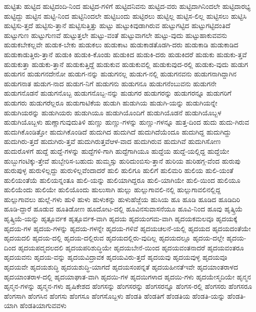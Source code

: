 {ಹುಟ್ಟಿತು
ಹುಟ್ಟಿದ
ಹುಟ್ಟಿದಂದಿ-ನಿಂದ
ಹುಟ್ಟಿದ-ಗಳಿಗೆ
ಹುಟ್ಟಿದನಿವನು
ಹುಟ್ಟಿದ-ವರು
ಹುಟ್ಟಿದಾಗಿನಿಂದಲೇ
ಹುಟ್ಟಿದಾರಭ್ಯ
ಹುಟ್ಟಿದ್ದು
ಹುಟ್ಟಿನ
ಹುಟ್ಟಿ-ನಿಂದ
ಹುಟ್ಟಿನಿಂದಲೇ
ಹುಟ್ಟಿಬಂದು
ಹುಟ್ಟಿರಲು
ಹುಟ್ಟಿಲ್ಲ
ಹುಟ್ಟಿಸ-ಲಿಲ್ಲ
ಹುಟ್ಟಿಸಲು
ಹುಟ್ಟಿಸಿ
ಹುಟ್ಟಿಸು-ತ್ತದೆ
ಹುಟ್ಟಿಸು-ತ್ತಾನೆ
ಹುಟ್ಟಿಸುತ್ತಿತ್ತು
ಹುಟ್ಟು
ಹುಟ್ಟುಕಿವುಡಾಗಿರುವ
ಹುಟ್ಟುಗಟ್ಟಿದ
ಹುಟ್ಟುಗಟ್ಟಿದಂತಿದೆ
ಹುಟ್ಟುಗುಣ
ಹುಟ್ಟುಗುಣವೆ
ಹುಟ್ಟುತ್ತಲೇ
ಹುಟ್ಟು-ವಂತೆ
ಹುಟ್ಟುವಾಗಲೇ
ಹುಟ್ಟು-ವುದು
ಹುಟ್ಟುಹಾಕುವವನು
ಹುಡುಕಬೇಕಲ್ಲವೇ
ಹುಡುಕ-ಬೇಕು
ಹುಡುಕಲು
ಹುಡುಕಾಟ
ಹುಡುಕಾಡತೊಡಗಿ-ದರು
ಹುಡುಕಾಡಿ
ಹುಡುಕಾಡಿದ
ಹುಡುಕಾಡುತ್ತಿರು-ತ್ತಾನೆ
ಹುಡುಕಿ
ಹುಡುಕಿ-ಕೊಂಡು
ಹುಡುಕಿದ
ಹುಡುಕಿ-ದರು
ಹುಡುಕಿದರೆ
ಹುಡುಕು
ಹುಡುಕು-ತ್ತವೆ
ಹುಡುಕುತ್ತಾ
ಹುಡುಕು-ತ್ತಾನೆ
ಹುಡುಕುತ್ತಿದ್ದೆ
ಹುಡುಕುವ
ಹುಡುಕುವಲ್ಲಿ
ಹುಡುಕುವುದ-ರಲ್ಲಿ
ಹುಡುಕು-ವುದು
ಹುಡುಗ
ಹುಡುಗನ
ಹುಡುಗನದೇನೋ
ಹುಡುಗ-ನನ್ನು
ಹುಡುಗನಲ್ಲ
ಹುಡುಗ-ನಲ್ಲಿ
ಹುಡುಗನವನು
ಹುಡುಗನಾಗಿದ್ದಾಗಿನ
ಹುಡುಗನಾತ
ಹುಡುಗ-ನಾದ
ಹುಡುಗ-ನಿಗೆ
ಹುಡುಗನು
ಹುಡುಗನೂ
ಹುಡುಗನೆಂಬುವನು
ಹುಡುಗನೇ
ಹುಡುಗನೊಡನೆ
ಹುಡುಗನೊಬ್ಬ
ಹುಡುಗನೊಬ್ಬ-ನನ್ನು
ಹುಡುಗರ
ಹುಡುಗರನ್ನು
ಹುಡುಗರನ್ನೂ
ಹುಡುಗರಿಗೆ
ಹುಡುಗರು
ಹುಡುಗರೆಲ್ಲರೂ
ಹುಡುಗಾಟಿಕೆಯ
ಹುಡುಗಿ
ಹುಡುಗಿಯ
ಹುಡುಗಿ-ಯನ್ನು
ಹುಡುಗಿಯನ್ನೇ
ಹುಡುಗಿಯರನ್ನು
ಹುಡುಗಿಯರು
ಹುಡುಗಿಯೂ
ಹುಡುಗಿಯೊಂದಿಗೆ
ಹುಡುಗಿಯೊಡನೆ
ಹುಡುಗಿಯೊಬ್ಬಳ
ಹುಡುಗಿಯೊಬ್ಬಳು
ಹುಣ್ಣಾಗುವುದುತಿಳಿ
ಹುಣ್ಣು
ಹುಣ್ಣು-ಗಳನ್ನು
ಹುಣ್ಣು-ಗಳನ್ನೂ
ಹುತ್ತ-ದಿಂದ
ಹುದು
ಹುದು-ಗಿರುವ
ಹುದುಗಿಕೊಂಡಿತ್ತೋ
ಹುದುಗಿಕೊಂಡಿದೆ
ಹುದುಗಿದ
ಹುದುಗಿದೆ
ಹುದುಗಿದೆಯೆಂದೂ
ಹುದುಗಿದ್ದ
ಹುದುಗಿದ್ದು
ಹುದುಗಿರು-ತ್ತದೆ
ಹುದುಗಿರು-ತ್ತವೆ
ಹುದುಗಿರುತ್ತವೆಆಳ-ವಾದ
ಹುದುಗಿರುವ
ಹುದುಗಿವೆ
ಹುದುಗಿಸೋಣ
ಹುದುರೊಳಗೆ
ಹುದ್ದೆ
ಹುದ್ದೆ-ಗಳನ್ನು
ಹುದ್ದೆಗಳಿ-ಗಾಗಿ
ಹುದ್ದೆಗಾಗಿಯೂ
ಹುದ್ದೆಯ
ಹುದ್ದೆ-ಯಲ್ಲಿದ್ದ
ಹುದ್ದೆಯೇ
ಹುಬ್ಬುಗಂಟಿಕ್ಕು-ತ್ತೇವೆ
ಹುಬ್ಬೇರಿಸ-ಬಹುದು
ಹುಮ್ಮಸ್ಸು
ಹುರಿದುಂಬಿಸು-ತ್ತಾನೆ
ಹುರಿಯ
ಹುರಿಹಗ್ಗ-ವೆಂದ
ಹುರುಪು
ಹುರುಪುಳ್ಳ
ಹುರುಳಿಲ್ಲದ್ದು
ಹುರುಳಿಲ್ಲವೆಂದಾದರೆ
ಹುಲಿ
ಹುಲಿಗೂ
ಹುಲಿಗೆ
ಹುಲಿಮರಿ
ಹುಲಿಯ
ಹುಲಿ-ಯಂತೆ
ಹುಲಿಯಂತೆಯೆ
ಹುಲಿಯನ್ನಂತೂ
ಹುಲಿ-ಯನ್ನು
ಹುಲಿಯಾಗಿದ್ದರೂ
ಹುಲಿ-ಯಾಗಿಯೇ
ಹುಲಿ-ಯಿಂದ
ಹುಲಿಯೂ
ಹುಲಿಯೆಂದು
ಹುಲಿಯೇ
ಹುಲಿಯೊಂದು
ಹುಲುಸಾಗಿ
ಹುಲ್ಲು
ಹುಲ್ಲುಗಾವಲಿ-ನಲ್ಲಿ
ಹುಲ್ಲುಗಾವಲಿನಲ್ಲಿದ್ದ
ಹುಲ್ಲುಗಾವಲು
ಹುಲ್ಲೆ-ಗಳು
ಹುಳಿ
ಹುಳು
ಹುಳುಕನ್ನು
ಹುಳುಹೆಜ್ಜೆಯ
ಹುಸಿಯ
ಹೂ
ಹೂಡಿ
ಹೂಡಿದ
ಹೂಡಿದಿರಿ
ಹೂಡಿ-ದ್ದಾರೆ
ಹೂಡುವ
ಹೂತಿಡೋಣ
ಹೂದೋಟ-ದಲ್ಲಿ
ಹೂವಿನಸುವಾಸನೆಯೂ
ಹೂವಿ-ನಿಂದ
ಹೂವು
ಹೃತ್ಕ್ರಿಯೆ
ಹೃತ್ಕ್ರಿಯೆ-ಯನ್ನು
ಹೃತ್ಪೂರ್ವಕ
ಹೃತ್ಪೂರ್ವಕ-ವಾಗಿ
ಹೃದಯ
ಹೃದಯಂಗಮ-ವಾಗಿ
ಹೃದಯಕಮಲವೂ
ಹೃದಯಕ್ಕೆ
ಹೃದಯ-ಗಳ
ಹೃದಯ-ಗಳನ್ನು
ಹೃದಯ-ಗಳನ್ನೇ
ಹೃದಯ-ಗಳಿವೆ
ಹೃದಯಚಲನೆ-ಯಲ್ಲಿ
ಹೃದಯದ
ಹೃದಯದಂತೆಯೇ
ಹೃದಯದಲಿ
ಹೃದಯ-ದಲ್ಲಿ
ಹೃದಯ-ದಲ್ಲಿರುವ
ಹೃದಯದಲ್ಲಿರು-ವುದಿಲ್ಲ
ಹೃದಯದಲ್ಲೂ
ಹೃದಯ-ದಲ್ಲೇ
ಹೃದಯ-ದಿಂದ
ಹೃದಯಪದ್ಮದಲದಲಿ
ಹೃದಯಪರಿಶುದ್ಧಿಯೇ
ಹೃದಯಬೇನೆ-ಯಿಂದ
ಹೃದಯವಂತನಾದರೆ
ಹೃದಯವಂತರೂ
ಹೃದಯವನು
ಹೃದಯ-ವನ್ನು
ಹೃದಯವಿದ್ರಾವಕ
ಹೃದಯವಿರು-ತ್ತದೆ
ಹೃದಯವು
ಹೃದಯವುಳ್ಳ
ಹೃದಯವೂ
ಹೃದಯವೇ
ಹೃದಯಶುದ್ಧಿ
ಹೃದಯಶುದ್ಧಿ-ಯಾಗದೆ
ಹೃದಯಸಂಪನ್ನತೆ
ಹೃದಯಹೀನತೆಇವೇ
ಹೃದಯಾಂತರಾಳದ
ಹೃದಯಾಂತರಾಳ-ದಲ್ಲಿ
ಹೃದಯಾಘಾತ-ವಾಗಿ
ಹೃದಯಿ-ಗಳ
ಹೃದಯಿಗಳಾದ
ಹೃದಯಿ-ಗಳು
ಹೃದಯೇಸ್ಮದಿಯೇ
ಹೃನ್ಮನ
ಹೃನ್ಮನ-ಗಳನ್ನು
ಹೃನ್ಮನ-ಗಳು
ಹೃಷಿಕೇಶದ
ಹೆಂಗಸನ್ನು
ಹೆಂಗಸರನ್ನು
ಹೆಂಗಸರನ್ನೂ
ಹೆಂಗಸ-ರಲ್ಲಿ
ಹೆಂಗಸರು
ಹೆಂಗಸರೂ
ಹೆಂಗಸಾಗಿ
ಹೆಂಗಸಿನ
ಹೆಂಗಸು
ಹೆಂಗಸೂ
ಹೆಂಗಸೊಬ್ಬಳು
ಹೆಂಡತಿ
ಹೆಂಡತಿಗೆ
ಹೆಂಡತಿಯ
ಹೆಂಡತಿ-ಯನ್ನು
ಹೆಂಡತಿ-ಯಾಗಿ
ಹೆಂಡತಿಯಾಗುವವಳು
}

